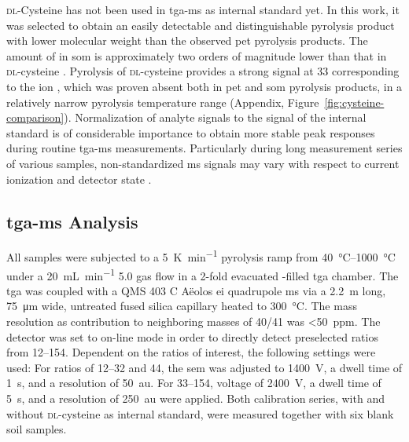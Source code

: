 \textsc{dl}-Cysteine has not been used in \ac{tga-ms} as internal standard yet. In this work, it was selected to obtain an easily detectable and distinguishable pyrolysis product with lower molecular weight than the observed \ac{pet} pyrolysis products. The amount of  in \ac{som} is approximately two orders of magnitude lower than that in \textsc{dl}-cysteine \citep{BlumeScheffer2016}. Pyrolysis of \textsc{dl}-cysteine provides a strong signal at \SI{33}{\mz} corresponding to the  ion \citep{ChoiDetermination1995}, which was proven absent both in \ac{pet} and \ac{som} pyrolysis products, in a relatively narrow pyrolysis temperature range (Appendix, Figure~\ref{fig:cysteine-comparison}).
Normalization of analyte signals to the signal of the internal standard is of considerable importance to obtain more stable peak responses during routine \ac{tga-ms} measurements. Particularly during long measurement series of various samples, non-standardized \ac{ms} signals may vary with respect to current ionization and detector state \citep{NETZSCHGeratebauMS2010}.

\subsection{\Acs{tga-ms} Analysis}\label{sec:tga-ms-analysis}

All samples were subjected to a \SI{5}{\kelvin\per\minute} pyrolysis ramp from \SIrange[range-phrase = { to }]{40}{1000}{\degreeCelsius} under a \SI{20}{\milli\liter\per\minute}  5.0 gas flow in a \num{2}-fold evacuated -filled \ac{tga} chamber. The \ac{tga} was coupled with a QMS 403 C Aëolos \ac{ei} quadrupole \ac{ms} via a \SI{2.2}{\meter} long, \SI{75}{\micro\meter} wide, untreated fused silica capillary heated to \SI{300}{\degreeCelsius}.
The mass resolution as contribution to neighboring masses of \num{40}/\num{41} was \SI{<50}{ppm}. The detector was set to on-line mode in order to directly detect preselected \si{\mz} ratios from \numrange[range-phrase = { to }]{12}{154}.
Dependent on the \si{\mz} ratios of interest, the following settings were used: For \si{\mz} ratios of \numrange{12}{32} and \num{44}, the \ac{sem} was adjusted to \SI{1400}{\volt}, a dwell time of \SI{1}{\second}, and a resolution of \SI{50}{au}. For \si{\mz} \numrange{33}{154},  voltage of \SI{2400}{\volt}, a dwell time of \SI{5}{\second}, and a resolution of \SI{250}{au} were applied.
Both calibration series, with and without \textsc{dl}-cysteine as internal standard, were measured together with six blank soil samples.


